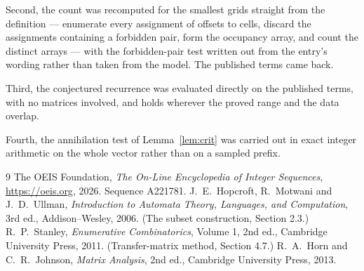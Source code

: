\documentclass[11pt,a4paper]{article}
\theoremstyle{plain}
\theoremstyle{definition}
\begin{document}
Second, the count was recomputed for the smallest grids straight from the definition ---
enumerate every assignment of offsets to cells, discard the assignments containing a forbidden
pair, form the occupancy array, and count the distinct arrays --- with the forbidden-pair test
written out from the entry's wording rather than taken from the model. The published terms
came back.

Third, the conjectured recurrence was evaluated directly on the published terms, with no
matrices involved, and holds wherever the proved range and the data overlap.

Fourth, the annihilation test of Lemma~\ref{lem:crit} was carried out in exact integer
arithmetic on the whole vector rather than on a sampled prefix.

\begin{thebibliography}{9}
 The OEIS Foundation, \emph{The On-Line Encyclopedia of Integer
Sequences}, \url{https://oeis.org}, 2026. Sequence A221781.
 J.~E.~Hopcroft, R.~Motwani and J.~D.~Ullman, \emph{Introduction to Automata
Theory, Languages, and Computation}, 3rd ed., Addison--Wesley, 2006. (The subset
construction, Section 2.3.)
 R.~P.~Stanley, \emph{Enumerative Combinatorics}, Volume 1, 2nd ed.,
Cambridge University Press, 2011. (Transfer-matrix method, Section 4.7.)
 R.~A.~Horn and C.~R.~Johnson, \emph{Matrix Analysis}, 2nd ed., Cambridge
University Press, 2013.
\end{thebibliography}
\end{document}
